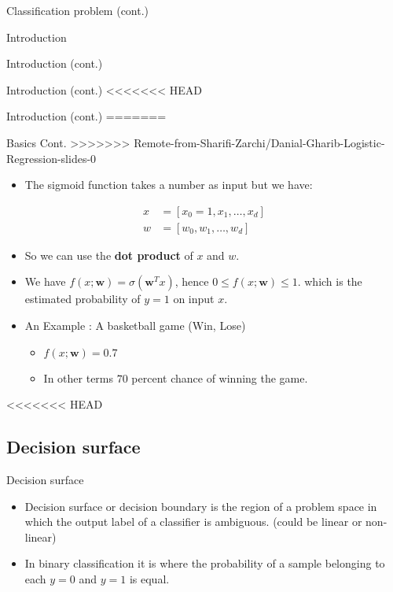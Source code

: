 \documentclass[serif, aspectratio=169]{beamer}
\begin{document}
\begin{frame}{Classification problem (cont.)}
\begin{itemize}
\begin{frame}{Introduction}
\begin{itemize}
\begin{frame}{Introduction (cont.)}
\begin{frame}{Introduction (cont.)}
<<<<<<< HEAD
\begin{frame}{Introduction (cont.)}
=======
\begin{frame}{Basics Cont.}
>>>>>>> Remote-from-Sharifi-Zarchi/Danial-Gharib-Logistic-Regression-slides-0
    \begin{itemize}
      \item The sigmoid function takes a number as input but we have:
    \end{itemize}
        \begin{align*}
            x &= [x_0=1,x_1, \dots, x_d] \\
            w &= [w_0, w_1, \dots, w_d]
        \end{align*}
    \begin{itemize} 
      \item So we can use the \textbf{dot product} of $x$ and $w$.
      
      \item We have $f(x;\mathbf{w}) = \sigma (\mathbf{w}^Tx)$, hence $0\leq f(x;\mathbf{w}) \leq 1$. which is the estimated probability of $y=1$ on input $x$.

      \item An Example : A basketball game (Win, Lose)
        \begin{itemize}
            \item $f(x;\mathbf{w}) = 0.7$
            \item In other terms $70$ percent chance of winning the game.
        \end{itemize}
        
    \end{itemize}
\end{frame}
<<<<<<< HEAD
\subsection{Decision surface}
\begin{frame}{Decision surface}
    \begin{itemize}
      \item Decision surface or decision boundary is the region of a problem space in which the output label of a classifier is ambiguous. (could be linear or non-linear)
      \item In binary classification it is where the probability of a sample belonging to each $y=0$ and $y=1$ is equal.
    \end{itemize}
    

\end{frame}
\end{frame}
\end{frame}
\end{frame}
\end{itemize}
\end{frame}
\end{itemize}
\end{frame}
\end{document}
